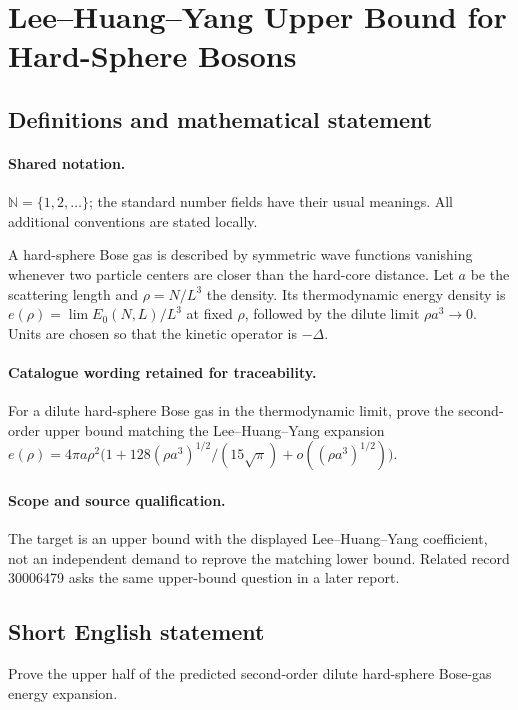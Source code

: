 \documentclass[11pt]{article}
\begin{document}
\section{Lee–Huang–Yang Upper Bound for Hard-Sphere Bosons}\label{statement}

\subsection{Definitions and mathematical statement}

\paragraph{Shared notation.}$\mathbb N=\{1,2,\ldots\}$; the standard number fields have their usual meanings. All additional conventions are stated locally.


A hard-sphere Bose gas is described by symmetric wave functions vanishing whenever two particle centers are closer than the hard-core distance. Let $a$ be the scattering length and $\rho=N/L^3$ the density. Its thermodynamic energy density is $e(\rho)=\lim E_0(N,L)/L^3$ at fixed $\rho$, followed by the dilute limit $\rho a^3\to0$. Units are chosen so that the kinetic operator is $-\Delta$.

\paragraph{Catalogue wording retained for traceability.}
For a dilute hard-sphere Bose gas in the thermodynamic limit, prove the second-order upper bound matching the Lee–Huang–Yang expansion $e(\rho)=4\pi a\rho^2\bigl(1+128(\rho a^3)^{1/2}/(15\sqrt\pi)+o((\rho a^3)^{1/2})\bigr)$.

\paragraph{Scope and source qualification.}The target is an upper bound with the displayed Lee--Huang--Yang coefficient, not an independent demand to reprove the matching lower bound. Related record 30006479 asks the same upper-bound question in a later report.
\subsection{Short English statement}
Prove the upper half of the predicted second-order dilute hard-sphere Bose-gas energy expansion.
\end{document}

